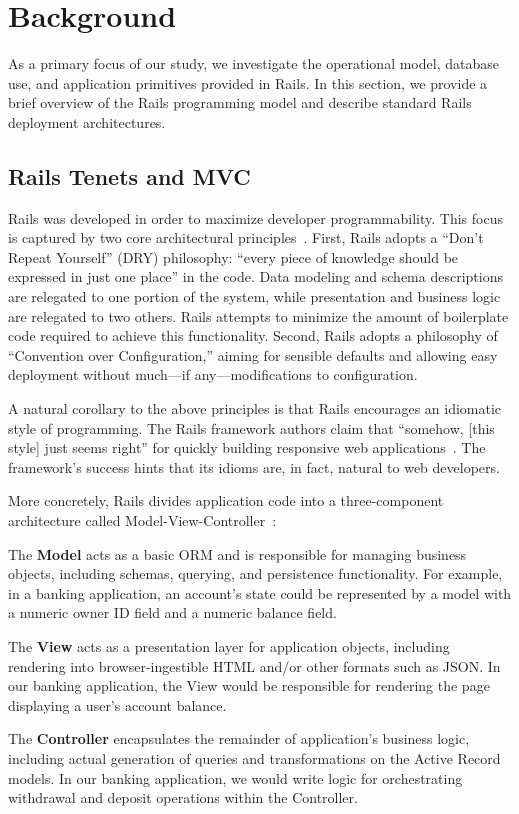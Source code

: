 
\section{Background}
\label{sec:motivation}

As a primary focus of our study, we investigate the operational model, database use, and application primitives provided in Rails. In this section, we provide a brief overview of the Rails programming model and describe standard Rails deployment architectures.

\subsection{Rails Tenets and MVC}
\label{sec:mvc}

Rails was developed in order to maximize developer programmability. This focus is captured by two core architectural principles~\cite{rails-book}. First, Rails adopts a ``Don't Repeat Yourself'' (DRY) philosophy: ``every piece of knowledge should be expressed in just one place'' in the code. Data modeling and schema descriptions are relegated to one portion of the system, while presentation and business logic are relegated to two others. Rails attempts to minimize the amount of boilerplate code required to achieve this functionality. Second, Rails adopts a philosophy of ``Convention over Configuration,'' aiming for sensible defaults and allowing easy deployment without much---if any---modifications to configuration.

A natural corollary to the above principles is that Rails encourages an idiomatic style of programming. The Rails framework authors claim that ``somehow, [this style] just seems right'' for quickly building responsive web applications~\cite{rails-book}. The framework's success hints that its idioms are, in fact, natural to web developers.

More concretely, Rails divides application code into a three-component architecture called Model-View-Controller~\cite{gangoffour,mvc}:

\begin{motitemize}
\item The \textbf{Model} acts as a basic ORM and is responsible for managing business objects, including schemas, querying, and persistence functionality. For example, in a banking application, an account's state could be represented by a model with a numeric owner ID field and a numeric balance field.

\item The \textbf{View} acts as a presentation layer for application objects, including rendering into browser-ingestible HTML and/or other formats such as JSON. In our banking application, the View would be responsible for rendering the page displaying a user's account balance.

\item The \textbf{Controller} encapsulates the remainder of application's business logic, including actual generation of queries and transformations on the Active Record models. In our banking application, we would write logic for orchestrating withdrawal and deposit operations within the Controller.
\end{motitemize}

